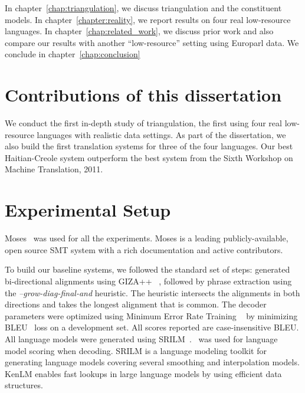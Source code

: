 In chapter~\ref{chap:triangulation}, we discuss triangulation and the constituent models. In chapter~\ref{chapter:reality}, we report results on four real low-resource languages. In chapter~\ref{chap:related_work}, we discuss prior work and also compare our results with another ``low-resource'' setting using Europarl data. We conclude in chapter~\ref{chap:conclusion}

\section{Contributions of this dissertation}
\label{sec:summary}
We conduct the first in-depth study of triangulation, the first using four real low-resource languages with realistic data settings. As part of the dissertation, we also build the first translation systems for three of the four languages. Our best Haitian-Creole system outperform the best system from the Sixth Workshop on Machine Translation, 2011. 


\section{Experimental Setup}
\label{sec:setup}


Moses~\cite{Koehn:07} was used for all the experiments. Moses is a leading publicly-available, open source SMT system with a rich documentation and active contributors. 

To build our baseline systems, we followed the standard set of steps: generated bi-directional alignments using GIZA++ ~\cite{OchNey:03}, followed by phrase extraction using the \emph{--grow-diag-final-and} heuristic. The heuristic intersects the alignments in both directions and takes the longest alignment that is common. The decoder parameters were optimized using Minimum Error Rate Training ~\cite{Och:03} by minimizing BLEU~\cite{Papineni:02} loss on a development set. All scores reported are case-insensitive BLEU. All language models were generated using SRILM~\cite{Stolcke:02}.~\cite{Ken:11} was used for language model scoring when decoding. SRILM is a language modeling toolkit for generating language models covering several smoothing and interpolation models. KenLM enables fast lookups in large language models by using efficient data structures.  
